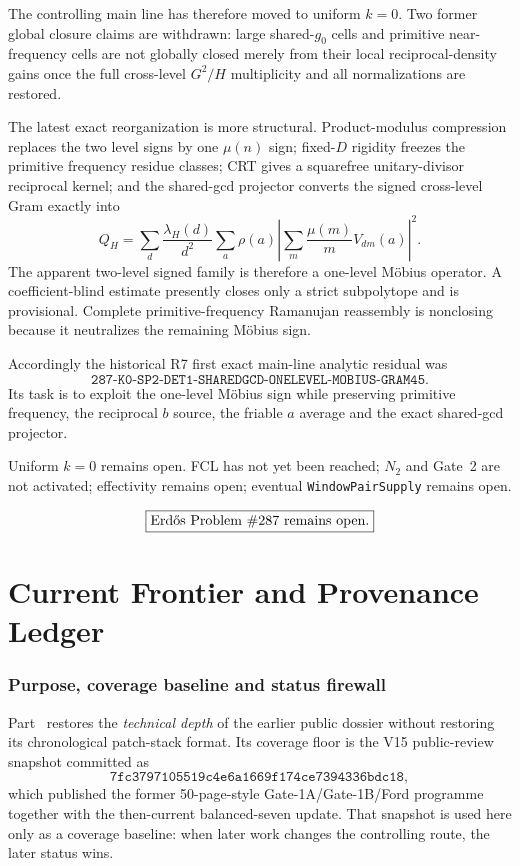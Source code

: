 \documentclass[11pt]{article}
\theoremstyle{definition}
\newcommand{\1}{\mathbf 1}
\begin{document}
The controlling main line has therefore moved to uniform $k=0$.  Two former global closure
claims are withdrawn: large shared-$g_0$ cells and primitive near-frequency cells are not
globally closed merely from their local reciprocal-density gains once the full
cross-level $G^2/H$ multiplicity and all normalizations are restored.

The latest exact reorganization is more structural.  Product-modulus compression replaces
the two level signs by one $\mu(n)$ sign; fixed-$D$ rigidity freezes the primitive
frequency residue classes; CRT gives a squarefree unitary-divisor reciprocal kernel; and
the shared-gcd projector converts the signed cross-level Gram exactly into
\[
Q_H=
\sum_d\frac{\lambda_H(d)}{d^2}
\sum_a\rho(a)
\left|
\sum_m\frac{\mu(m)}mV_{dm}(a)
\right|^2.
\]
The apparent two-level signed family is therefore a one-level M\"obius operator.  A
coefficient-blind estimate presently closes only a strict subpolytope and is provisional.
Complete primitive-frequency Ramanujan reassembly is nonclosing because it neutralizes the
remaining M\"obius sign.

Accordingly the historical R7 first exact main-line analytic residual was
\[
\boxed{
\texttt{287-K0-SP2-DET1-SHAREDGCD-ONELEVEL-MOBIUS-GRAM45}.
}
\]
Its task is to exploit the one-level M\"obius sign while preserving primitive frequency,
the reciprocal $b$ source, the friable $a$ average and the exact shared-gcd projector.

Uniform $k=0$ remains open.  FCL has not yet been reached; $N_2$ and Gate~2 are not
activated; effectivity remains open; eventual \texttt{WindowPairSupply} remains open.

\[
\boxed{\text{Erd\H{o}s Problem \#287 remains open}.}
\]

\clearpage
\part{Current Frontier and Provenance Ledger}
\label{part:technical-ledger}

\section{Purpose, coverage baseline and status firewall}
\label{sec:technical-baseline}

Part~\ref{part:technical-ledger} restores the \emph{technical depth} of the earlier public
dossier without restoring its chronological patch-stack format.  Its coverage floor is the
V15 public-review snapshot committed as
\[
\boxed{\texttt{7fc3797105519c4e6a1669f174ce7394336bdc18}},
\]
which published the former 50-page-style Gate-1A/Gate-1B/Ford programme together with the
then-current balanced-seven update.  That snapshot is used here only as a coverage baseline:
when later work changes the controlling route, the later status wins.
\end{document}
